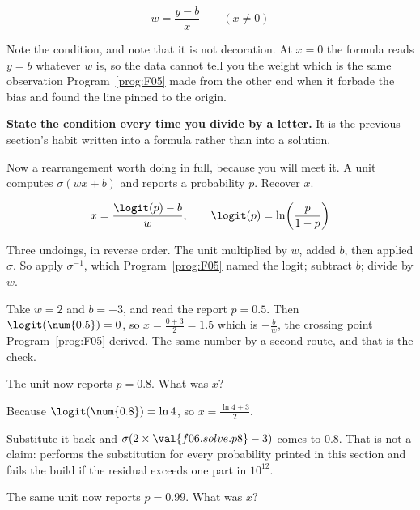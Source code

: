 \begin{fr}
\begin{ansblock}
\[ w = \frac{y - b}{x} \qquad (x \ne 0) \]
\end{ansblock}

Note the condition, and note that it is not decoration. At $x = 0$ the formula
reads $y = b$ whatever $w$ is, so the data cannot tell you the weight \dash{}
which is the same observation Program~\ref{prog:F05} made from the other end
when it forbade the bias and found the line pinned to the origin.

\textbf{State the condition every time you divide by a letter.} It is the
previous section's habit written into a formula rather than into a solution.

Now a rearrangement worth doing in full, because you will meet it. A unit
computes $\sigma(wx + b)$ and reports a probability $p$. Recover $x$.
\nextframe
\end{fr}

\begin{fr}
\begin{ansblock}
\[ x = \frac{\logit(p) - b}{w}, \qquad
   \logit(p) = \ln\!\left(\frac{p}{1-p}\right) \]
\end{ansblock}

Three undoings, in reverse order. The unit multiplied by $w$, added $b$, then
applied $\sigma$. So apply $\sigma^{-1}$, which Program~\ref{prog:F05} named
the logit; subtract $b$; divide by $w$.

Take $w = 2$ and $b = -3$, and read the report $p = \num{0.5}$. Then
$\logit(\num{0.5}) = 0$, so $x = \frac{0 + 3}{2} = \num{1.5}$ \dash{} which is
$-\frac{b}{w}$, the crossing point Program~\ref{prog:F05} derived. The same
number by a second route, and that is the check.

The unit now reports $p = \num{0.8}$. What was $x$?
\nextframe
\end{fr}

\begin{fr}
Because $\logit(\num{0.8}) = \ln 4$, so
$x = \frac{\ln 4 + 3}{2}$.

Substitute it back and $\sigma(2 \times \val{f06.solve.p8} - 3)$ comes to
$\num{0.8}$. That is not a claim:  performs the
substitution for every probability printed in this section and fails the build
if the residual exceeds one part in $10^{12}$.

The same unit now reports $p = \num{0.99}$. What was $x$?
\nextframe
\end{fr}

